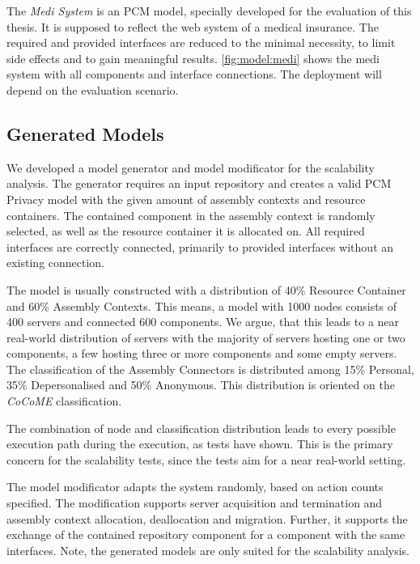 The \textit{Medi System} is an PCM model, specially developed for the evaluation of this thesis. It is supposed to reflect the web system of a medical insurance. The required and provided interfaces are reduced to the minimal necessity, to limit side effects and to gain meaningful results. \autoref{fig:model:medi} shows the medi system with all components and interface connections. The deployment will depend on the evaluation scenario.


\subsection{Generated Models}
\label{sec:Evaluation:models:generated}

We developed a model generator and model modificator for the scalability analysis. The generator requires an input repository and creates a valid PCM Privacy model with the given amount of assembly contexts and resource containers. The contained component in the assembly context is randomly selected, as well as the resource container it is allocated on. All required interfaces are correctly connected, primarily to provided interfaces without an existing connection.

The model is usually constructed with a distribution of 40\% Resource Container and 60\% Assembly Contexts. This means, a model with 1000 nodes consists of 400 servers and connected 600 components. We argue, that this leads to a near real-world distribution of servers with the majority of servers hosting one or two components, a few hosting three or more components and some empty servers. The classification of the Assembly Connectors is distributed among 15\% Personal, 35\% Depersonalised and 50\% Anonymous. This distribution is oriented on the \textit{CoCoME} classification.

The combination of node and classification distribution leads to every possible execution path during the execution, as tests have shown. This is the primary concern for the scalability tests, since the tests aim for a near real-world setting.

The model modificator adapts the system randomly, based on action counts specified. The modification supports server acquisition and termination and assembly context allocation, deallocation and migration. Further, it supports the exchange of the contained repository component for a component with the same interfaces. Note, the generated models are only suited for the scalability analysis. 



